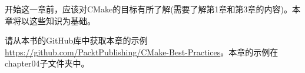 开始这一章前，应该对CMake的目标有所了解(需要了解第1章和第3章的内容)。本章将以这些知识为基础。

请从本书的GitHub库中获取本章的示例\url{https://github.com/PacktPublishing/CMake-Best-Practices}。本章的示例在chapter04子文件夹中。